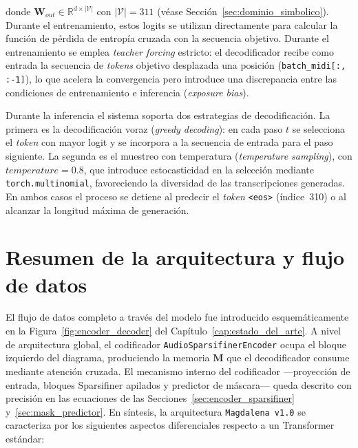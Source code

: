 donde $\mathbf{W}_{out} \in \mathbb{R}^{d \times |\mathcal{V}|}$ con $|\mathcal{V}| = 311$ (véase Sección~\ref{sec:dominio_simbolico}).
Durante el entrenamiento, estos logits se utilizan directamente para calcular la función
de pérdida de entropía cruzada con la secuencia objetivo. Durante el entrenamiento se emplea \textit{teacher forcing}
estricto: el decodificador recibe como entrada la secuencia de
\textit{tokens} objetivo desplazada una posición
(\texttt{batch\_midi[:, :-1]}), lo que acelera la convergencia
pero introduce una discrepancia entre las condiciones de
entrenamiento e inferencia (\textit{exposure bias}).

Durante la inferencia el sistema soporta dos estrategias de
decodificación. La primera es la decodificación voraz
(\textit{greedy decoding}): en cada paso $t$ se selecciona el
\textit{token} con mayor logit y se incorpora a la secuencia de
entrada para el paso siguiente. La segunda es el muestreo con
temperatura (\textit{temperature sampling}), con
$\mathit{temperature} = 0.8$, que introduce estocasticidad en
la selección mediante \texttt{torch.multinomial}, favoreciendo
la diversidad de las transcripciones generadas. En ambos casos
el proceso se detiene al predecir el \textit{token}
\texttt{<eos>} (índice~310) o al alcanzar la longitud máxima
de generación.

\section{Resumen de la arquitectura y flujo de datos}
\label{sec:resumen_arquitectura}

El flujo de datos completo a través del modelo fue introducido esquemáticamente en la Figura~\ref{fig:encoder_decoder} del
Capítulo~\ref{cap:estado_del_arte}. A nivel de arquitectura global,
el codificador \newline\texttt{AudioSparsifinerEncoder} ocupa el bloque
izquierdo del diagrama, produciendo la memoria $\mathbf{M}$ que
el decodificador consume mediante atención cruzada. El mecanismo
interno del codificador —proyección de entrada, bloques Sparsifiner
apilados y predictor de máscara— queda descrito con precisión en
las ecuaciones de las Secciones~\ref{sec:encoder_sparsifiner}
y~\ref{sec:mask_predictor}. En síntesis, la arquitectura \texttt{Magdalena v1.0}
se caracteriza por los siguientes aspectos diferenciales respecto a un Transformer
estándar:

